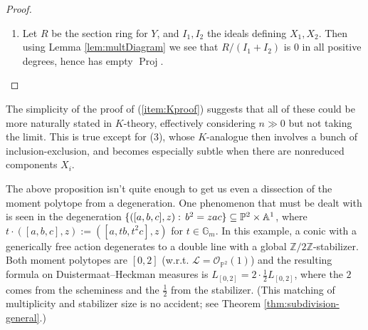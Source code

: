 \documentclass[11pt]{amsart}
\theoremstyle{definition}
\DeclareMathOperator{\Proj}{Proj}
\newcommand{\RR}{\mathbb{R}}
\newcommand{\ZZ}{\mathbb{Z}}
\newcommand{\PP}{\mathbb{P}}
\def\AA{{\mathbb A }}
\newcommand\lie[1]{{\mathfrak #1}}
\newcommand\calO{{\mathcal O}}
\newcommand\calL{{\mathcal L}}
\newcommand\Gm{{\mathbb G}_m}
\renewcommand\AA{{\mathbb A}}
\renewcommand{\colon}{\mathrel{:}}
\renewcommand{\colon}{:\mkern\thinmuskip}
\begin{document}
\begin{proof}
\begin{enumerate}
    For the second claim, note first using (1) and (2) that
    $DH(X,\calL)$ is absolutely continuous with respect to Lebesgue
    measure on $\lie t^*_\RR$, for the simple reason that it equals
    Lebesgue measure times the function that is $\frac 1 d$ on
    $\Phi(X,\calL)$ and $0$ elsewhere,
    where $d$ is the size of the generic stabilizer.

    Note second that if $T$ acts with positive-dimensional stabilizer
    $R$ on $X_i$, then $DH(X_i,\calL)$ is {\em not} absolutely
    continuous with respect to Lebesgue measure on $\lie t^*_\RR$,
    because by Proposition \ref{prop:spanOfPhi} it is supported on
    a translate of a proper linear subspace (and is not zero, by the positivity
    in (2)). Since each $DH(X_i,\calL)$ is a positive measure, and
    they add up to one that is absolutely continuous with respect to
    Lebesgue measure on $\lie t^*_\RR$, each summand individually is likewise
    absolutely continuous, precluding the positive-dimensional stabilizers.
  \item Let $R$ be the section ring for $Y$, and $I_1,I_2$ the ideals
    defining $X_1,X_2$. Then using Lemma \ref{lem:multDiagram} we see
    that $R/(I_1+I_2)$ is $0$ in all positive degrees, hence has
    empty $\Proj$.
    \qedhere
  \end{enumerate}
\end{proof}

The simplicity of the proof of (\ref{item:Kproof}) suggests that all
of these could be more naturally stated in $K$-theory, effectively
considering $n\gg 0$ but not taking the limit. This is true except for (3),
whose $K$-analogue then involves a bunch of inclusion-exclusion, and
becomes especially subtle when there are nonreduced components $X_i$.

The above proposition isn't quite enough to get us even
a dissection of the moment polytope from a degeneration.
One phenomenon that must be dealt with is seen in the degeneration
$\{([a,b,c],z)\colon b^2 = zac\} \subseteq \PP^2 \times \AA^1$, where
$t\cdot ([a,b,c],z) := ([a,tb,t^2c],z)$ for $t\in\Gm$. In this example,
a conic with a generically free action degenerates to a double line with a
global $\ZZ/2\ZZ$-stabilizer. Both moment polytopes are $[0,2]$ (w.r.t.
$\calL = \calO_{\PP^2}(1)$) and the resulting formula on
Duistermaat--Heckman measures is $L_{[0,2]} = 2\cdot\frac 1 2 L_{[0,2]}$,
where the $2$ comes from the scheminess and the $\frac 1 2$ from the stabilizer.
(This matching of multiplicity and stabilizer size is no accident; see Theorem \ref{thm:subdivision-general}.)
\end{document}
